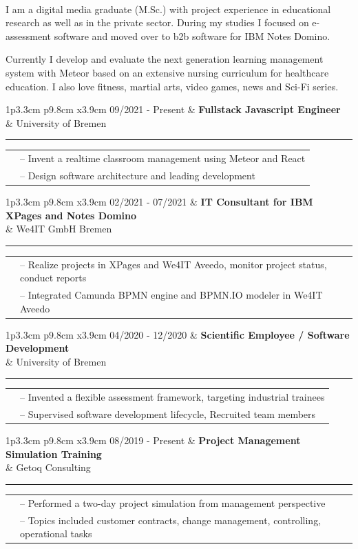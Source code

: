 \documentclass[10pt,A4]{article}
\newcommand{\cvsection}[1]{
	\colorbox{sectcol}{
	\mystrut \makebox[1\linewidth][l]{
		\textcolor{white}{\textbf{#1}}\hspace{4pt}
		}
		}
}
\newcommand{\cvevent}[5]
{
\vspace{8pt}

\begin{tabular*}{1\textwidth}{p{3.3cm}  p{9.8cm} x{3.9cm}}
	\textcolor{bgcol}{#1} 	& \textbf{#2} \\ 
	 						& \textcolor{sectcol}{#3} \\
\end{tabular*}

\textcolor{softcol}{\hrule}

\vspace{6pt}
\begin{tabular*}{1\textwidth}{p{3.3cm} p{13.4cm}}
	&	\textcolor{bgcol}{--}  #4\\[3pt]
	&	\textcolor{bgcol}{--}  #5\\[6pt]
\end{tabular*}
}
\newcommand{\mystrut}{\rule[-.3\baselineskip]{0pt}{\baselineskip}}
\begin{document}
\vspace{6pt}


\cvsection{Summary}\\
I am a digital media graduate (M.Sc.) with project experience in educational research as well as in 
the private sector. During my studies I focused on e-assessment software and moved over to b2b 
software for IBM Notes Domino.

Currently I develop and evaluate the next generation learning management system with Meteor based 
on an extensive nursing curriculum for healthcare education.  I also love fitness, martial arts, 
video games, news and Sci-Fi series.\\[-2pt]


\cvsection{Experience}

\cvevent{09/2021 - Present}{Fullstack Javascript Engineer}{University of Bremen}
{Invent a realtime classroom management using Meteor and React}
{Design software architecture and leading development}

\cvevent{02/2021 - 07/2021}{IT Consultant for IBM XPages and Notes Domino}{We4IT GmbH Bremen}
{Realize projects in XPages and We4IT Aveedo, monitor project status, conduct reports}
{Integrated Camunda BPMN engine and BPMN.IO modeler in We4IT Aveedo}

\cvevent{04/2020 - 12/2020}{Scientific Employee / Software Development}{University of Bremen}
{Invented a flexible assessment framework, targeting industrial trainees}
{Supervised software development lifecycle, Recruited team members}

\cvevent{08/2019 - Present}{Project Management Simulation Training}{Getoq Consulting}
{Performed a two-day project simulation from management perspective}{Topics included customer contracts, change management, controlling, operational tasks}


\cvsection{Education}
\end{document}
